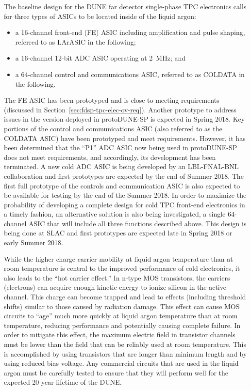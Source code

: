 The baseline design for the DUNE far detector single-phase TPC electronics calls for three types of ASICs to be located inside of the liquid argon:
\begin{itemize}
\item{a 16-channel front-end (FE) ASIC including amplification and pulse shaping, referred to as LArASIC in the following;}
\item{a 16-channel 12-bit ADC ASIC operating at 2~MHz; and}
\item{a 64-channel control and communications ASIC, referred to as COLDATA in the following.}
\end{itemize}
The FE ASIC has been prototyped and is close to meeting requirements (discussed in Section~\ref{sec:fdsp-tpc-elec-ov-req}). Another prototype to address issues in the version deployed in protoDUNE-SP is expected in Spring 2018. Key portions of the control and communications ASIC (also referred to as the COLDATA ASIC) have been prototyped and meet requirements.  However, it has been determined that the ``P1'' ADC ASIC now being used in protoDUNE-SP does not meet requirements, and accordingly, its development has been terminated.  A new cold ADC ASIC is being developed by an LBL-FNAL-BNL collaboration and first prototypes are expected by the end of Summer 2018.  The first full prototype of the controls and communication ASIC is also expected to be available for testing by the end of the Summer 2018.  In order to maximize the probability of developing a complete design for cold TPC front-end electronics in a timely fashion, an alternative solution is also being investigated, a single 64-channel ASIC that will include all three functions described above.  This design is being done at SLAC and first prototypes are expected late in Spring 2018 or early Summer 2018.

While the higher charge carrier mobility at liquid argon temperature than at room temperature is central to the improved performance of cold electronics, it also leads to the ``hot carrier effect.''  In n-type MOS transistors, the carriers (electrons) can acquire enough kinetic energy to ionize silicon in the active channel.  This charge can become trapped and lead to effects (including threshold shifts) similar to those caused by radiation damage.  This effect can cause MOS circuits to ``age'' much more quickly at liquid argon temperature than at room temperature, reducing performance and potentially causing complete failure.  In order to mitigate this effect, the maximum electric field in transistor channels must be lower than the field that can be reliably used at room temperature.  This is accomplished by using transistors that are longer than minimum length and by using reduced bias voltage.  Any commercial circuits that are used in the liquid argon must be carefully tested to ensure that they will perform well for the expected 20-year lifetime of the DUNE.

